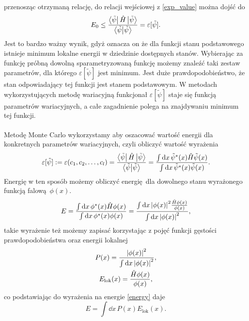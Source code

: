 \documentclass[12pt, a4paper]{article}
\begin{document}
    przenosząc otrzymaną relację, do relacji wejściowej z \eqref{exp_value} można dojść do
    \begin{equation}
        E_0 \leq \frac{\bra{\tilde{\psi}}\hat{H}\ket{\tilde{\psi}}}{\bra{\tilde{\psi}}\ket{\tilde{\psi}}} = \varepsilon[\tilde{\psi}].
    \end{equation}
    Jest to bardzo ważny wynik, gdyż oznacza on że dla funkcji stanu podstawowego istnieje minimum lokalne energii w dziedzinie dostępnych stanów.
    Wybierając za funkcję próbną dowolną sparametryzowaną funkcję możemy znaleźć taki zestaw parametrów, dla którego $\varepsilon[\tilde{\psi}]$ jest minimum.
    Jest duże prawdopodobieństwo, że stan odpowiadający tej funkcji jest stanem podstawowym.
    W metodach wykorzystujących metodę wariacyjną funkcjonał $\varepsilon[\tilde{\psi}]$ staje się funkcją parametrów wariacyjnych, a całe zagadnienie polega na znajdywaniu minimum tej funkcji.
    \\
    \\
    Metodę Monte Carlo wykorzystamy aby oszacować wartość energii dla konkretnych parametrów wariacyjnych, czyli obliczyć wartość wyrażenia
    \begin{equation}
        \varepsilon[\tilde{\psi}] := \varepsilon(c_1,c_2,\dots,c_l) =  \frac{\bra{\tilde{\psi}}\hat{H}\ket{\tilde{\psi}}}{\bra{\tilde{\psi}}\ket{\tilde{\psi}}} 
        = \frac{\int \dd x \, \tilde{\psi}^*(x)\hat{H}\tilde{\psi}(x)  }{\int \dd x \, \tilde{\psi}^*(x) \tilde{\psi}(x)}.
    \end{equation}
    Energię w ten sposób możemy obliczyć energię dla dowolnego stanu wyrażonego funkcją falową $\phi(x)$.
    \begin{equation}
        E = \frac{\int \dd x \, \phi^*(x) \hat{H} \phi(x)}{\int \dd x\, \phi^*(x)\phi(x)} = \frac{\int \dd x \, \abs{\phi(x)}^2 \frac{\hat{H} \phi(x)}{\phi(x)}}{\int \dd x \, \abs{\phi(x)}^2},
        \label{energy}
    \end{equation} 
    takie wyrażenie też możemy zapisać korzystając z pojęć funkcji gęstości prawdopodobieństwa oraz energii lokalnej
    \begin{gather}
        P(x) = \frac{\abs{\phi(x)}^2}{\int \dd x \, \abs{\phi(x)}^2}, \\
        E_{\text{lok}}(x) = \frac{\hat{H}\phi(x)}{\phi(x)},  
    \end{gather}
    co podstawiając do wyrażenia na energie \eqref{energy} daje
    \begin{equation}
        E = \int \dd x \, P(x) E_{\text{lok}}(x).
    \end{equation} 
\end{document}
